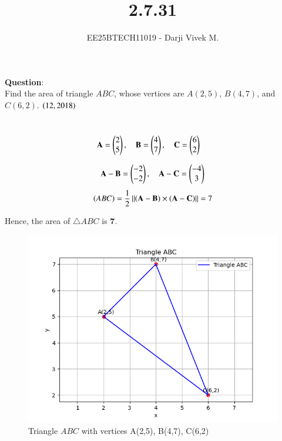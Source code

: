 \documentclass[journal]{IEEEtran}
\begin{document}


\title{2.7.31}
\author{EE25BTECH11019 - Darji Vivek M.}
{\let\newpage\relax\maketitle}

\renewcommand{\thefigure}{\theenumi}
\renewcommand{\thetable}{\theenumi}
\setlength{\intextsep}{10pt}
\renewcommand{\thetable}{\theenumi}

\textbf{Question}:\\
Find the area of triangle $ABC$, whose vertices are $A(2,5)$, $B(4,7)$, and $C(6,2)$.
\hfill $\left(12,2018\right)$

\solution \\[-2mm]



\begin{align}
\mathbf{A} &= \begin{pmatrix}2\\5\end{pmatrix}, \quad 
\mathbf{B} = \begin{pmatrix}4\\7\end{pmatrix}, \quad 
\mathbf{C} = \begin{pmatrix}6\\2\end{pmatrix}
\end{align}

\begin{align}
	\mathbf{A}-\mathbf{B}=\begin{pmatrix}-2\\-2\end{pmatrix},\quad \mathbf{A}-\mathbf{C}=\begin{pmatrix}-4\\3\end{pmatrix}
\end{align}
\begin{align}
	\left(ABC\right)=\frac{1}{2}\left\lVert\left(\mathbf{A}-\mathbf{B}\right)\times\left(\mathbf{A}-\mathbf{C}\right)\right\rVert=7
\end{align}

Hence, the area of $\triangle ABC$ is $\textbf{7}$.

\begin{figure}[H]
\centering
\includegraphics[width=0.75\columnwidth]{figs/triangle.png}
\caption{Triangle $ABC$ with vertices A(2,5), B(4,7), C(6,2)}
\label{fig:2.7.31}
\end{figure}
\end{document}
